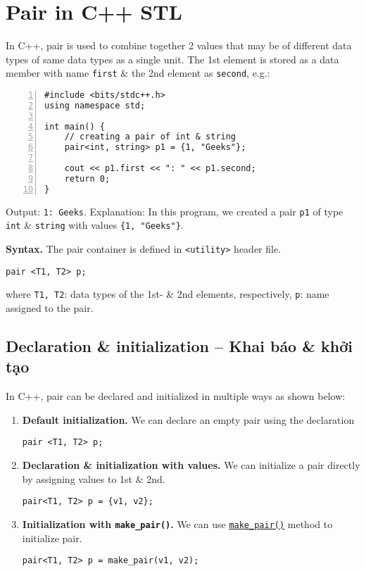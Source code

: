 \documentclass{article}
\begin{document}

\section{Pair in C++ STL}
In C++, pair is used to combine together 2 values that may be of different data types of same data types as a single unit. The 1st element is stored as a data member with name {\tt first} \& the 2nd element as {\tt second}, e.g.:
\begin{Verbatim}[numbers=left,xleftmargin=5mm]
#include <bits/stdc++.h>
using namespace std;

int main() {
    // creating a pair of int & string
    pair<int, string> p1 = {1, "Geeks"};
	
    cout << p1.first << ": " << p1.second;
    return 0;
}
\end{Verbatim}
Output: {\tt 1: Geeks}. Explanation: In this program, we created a pair {\tt p1} of type {\tt int} \& {\tt string} with values \verb|{1, "Geeks"}|.

{\bf Syntax.} The pair container is defined in {\tt<utility>} header file.
\begin{verbatim}
pair <T1, T2> p;
\end{verbatim}
where {\tt T1, T2}: data types of the 1st- \& 2nd elements, respectively, {\tt p}: name assigned to the pair.


\subsection{Declaration \& initialization -- Khai báo \& khởi tạo}
In C++, pair can be declared and initialized in multiple ways as shown below:
\begin{enumerate}
	\item {\bf Default initialization.} We can declare an empty pair using the declaration
	\begin{verbatim}
pair <T1, T2> p;
	\end{verbatim}
	\item {\bf Declaration \& initialization with values.} We can initialize a pair directly by assigning values to 1st \& 2nd.
	\begin{verbatim}
pair<T1, T2> p = {v1, v2};
	\end{verbatim}
	\item {\bf Initialization with \verb|make_pair()|.} We can use \href{https://www.geeksforgeeks.org/std-make_pair-in-cpp/}{\tt make\_pair()} method to initialize pair.
	\begin{verbatim}
pair<T1, T2> p = make_pair(v1, v2);
	\end{verbatim}
\end{enumerate}
\end{document}
